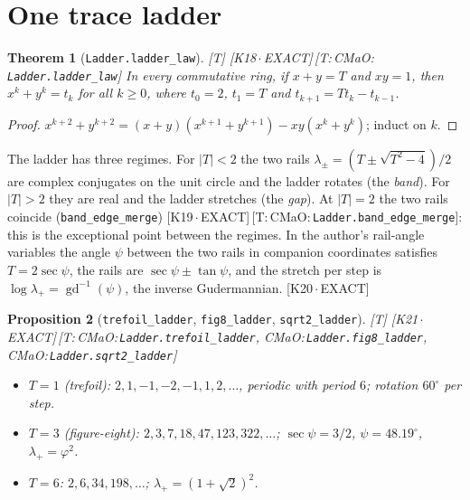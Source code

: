 \documentclass[11pt]{article}
\newtheorem{theorem}{Theorem}
\newtheorem{proposition}[theorem]{Proposition}
\theoremstyle{definition}
\newcommand{\grade}[1]{\textsf{\small[#1]}}
\newcommand{\lean}[1]{\texttt{\small #1}}
\newcommand{\dtag}[1]{#1}
\begin{document}
\section{One trace ladder}

\begin{theorem}[\lean{Ladder.ladder\_law}]\grade{T}\dtag{ \textsf{\small[K18\,$\cdot$\,EXACT]}\,\textsf{\small[T:\,CMaO:\,\lean{Ladder.\allowbreak{}ladder\_\allowbreak{}law}]}}
In every commutative ring, if $x+y=T$ and $xy=1$, then $x^k+y^k=t_k$ for all $k\ge0$, where $t_0=2$, $t_1=T$ and $t_{k+1}=Tt_k-t_{k-1}$.
\end{theorem}
\begin{proof}
$x^{k+2}+y^{k+2}=(x+y)(x^{k+1}+y^{k+1})-xy(x^k+y^k)$; induct on $k$.
\end{proof}

The ladder has three regimes. For $|T|<2$ the two rails $\lambda_\pm=(T\pm\sqrt{T^2-4})/2$ are complex conjugates on the unit circle and the ladder rotates (the \emph{band}). For $|T|>2$ they are real and the ladder stretches (the \emph{gap}). At $|T|=2$ the two rails coincide (\lean{band\_edge\_merge})\dtag{ \textsf{\small[K19\,$\cdot$\,EXACT]}\,\textsf{\small[T:\,CMaO:\,\lean{Ladder.\allowbreak{}band\_\allowbreak{}edge\_\allowbreak{}merge}]}}: this is the exceptional point between the regimes. In the author's rail-angle variables \cite{RailAngle} the angle $\psi$ between the two rails in companion coordinates satisfies $T=2\sec\psi$, the rails are $\sec\psi\pm\tan\psi$, and the stretch per step is $\log\lambda_+=\operatorname{gd}^{-1}(\psi)$, the inverse Gudermannian.\dtag{ \textsf{\small[K20\,$\cdot$\,EXACT]}}

\begin{proposition}[\lean{trefoil\_ladder}, \lean{fig8\_ladder}, \lean{sqrt2\_ladder}]\grade{T}\dtag{ \textsf{\small[K21\,$\cdot$\,EXACT]}\,\textsf{\small[T:\,CMaO:\,\lean{Ladder.\allowbreak{}trefoil\_\allowbreak{}ladder}, CMaO:\,\lean{Ladder.\allowbreak{}fig8\_\allowbreak{}ladder}, CMaO:\,\lean{Ladder.\allowbreak{}sqrt2\_\allowbreak{}ladder}]}}
\begin{itemize}
\item $T=1$ (trefoil): $2,1,-1,-2,-1,1,2,\dots$, periodic with period $6$; rotation $60^\circ$ per step.
\item $T=3$ (figure-eight): $2,3,7,18,47,123,322,\dots$; $\sec\psi=3/2$, $\psi=48.19^\circ$, $\lambda_+=\varphi^2$.
\item $T=6$: $2,6,34,198,\dots$; $\lambda_+=(1+\sqrt2)^2$.
\end{itemize}
\end{proposition}
\end{document}
